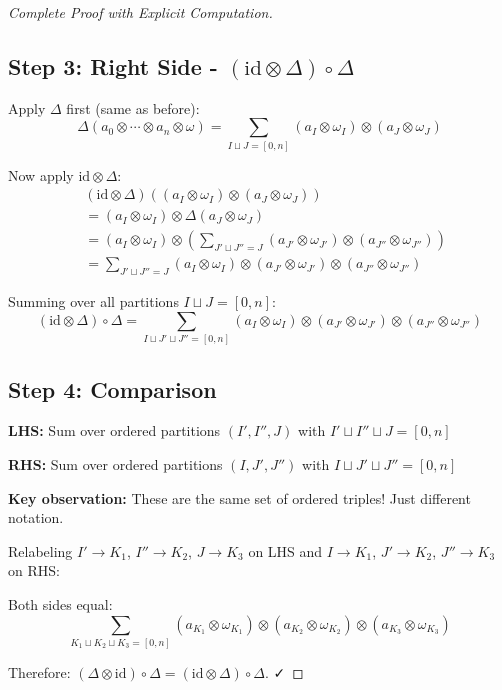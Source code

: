 \begin{proof}[Complete Proof with Explicit Computation]
\subsection*{Step 3: Right Side - $(\text{id} \otimes \Delta) \circ \Delta$}

Apply $\Delta$ first (same as before):
$$\Delta(a_0 \otimes \cdots \otimes a_n \otimes \omega) = \sum_{I \sqcup J = [0,n]} (a_I \otimes \omega_I) \otimes (a_J \otimes \omega_J)$$

Now apply $\text{id} \otimes \Delta$:
\begin{align*}
&(\text{id} \otimes \Delta)\left((a_I \otimes \omega_I) \otimes (a_J \otimes \omega_J)\right) \\
&= (a_I \otimes \omega_I) \otimes \Delta(a_J \otimes \omega_J) \\
&= (a_I \otimes \omega_I) \otimes \left(\sum_{J' \sqcup J'' = J} (a_{J'} \otimes \omega_{J'}) \otimes (a_{J''} \otimes \omega_{J''})\right) \\
&= \sum_{J' \sqcup J'' = J} (a_I \otimes \omega_I) \otimes (a_{J'} \otimes \omega_{J'}) \otimes (a_{J''} \otimes \omega_{J''})
\end{align*}

Summing over all partitions $I \sqcup J = [0,n]$:
$$(\text{id} \otimes \Delta) \circ \Delta = \sum_{I \sqcup J' \sqcup J'' = [0,n]} (a_I \otimes \omega_I) \otimes (a_{J'} \otimes \omega_{J'}) \otimes (a_{J''} \otimes \omega_{J''})$$

\subsection*{Step 4: Comparison}

\textbf{LHS:} Sum over ordered partitions $(I', I'', J)$ with $I' \sqcup I'' \sqcup J = [0,n]$

\textbf{RHS:} Sum over ordered partitions $(I, J', J'')$ with $I \sqcup J' \sqcup J'' = [0,n]$

\textbf{Key observation:} These are the same set of ordered triples! Just different notation.

Relabeling $I' \to K_1$, $I'' \to K_2$, $J \to K_3$ on LHS and $I \to K_1$, $J' \to K_2$, $J'' \to K_3$ on RHS:

Both sides equal:
$$\sum_{K_1 \sqcup K_2 \sqcup K_3 = [0,n]} (a_{K_1} \otimes \omega_{K_1}) \otimes (a_{K_2} \otimes \omega_{K_2}) \otimes (a_{K_3} \otimes \omega_{K_3})$$

Therefore: $(\Delta \otimes \text{id}) \circ \Delta = (\text{id} \otimes \Delta) \circ \Delta$. ✓
\end{proof}

